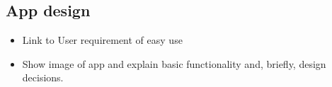\documentclass[class=report,11pt,crop=false]{standalone}
\begin{document}
\subsection{App design}
\begin{itemize}
    \item Link to User requirement of easy use
    \item Show image of app and explain basic functionality and, briefly, design decisions.
\end{itemize}

\ifstandalone

\printnoidxglossary[type=\acronymtype,nonumberlist]
\fi
\end{document}
